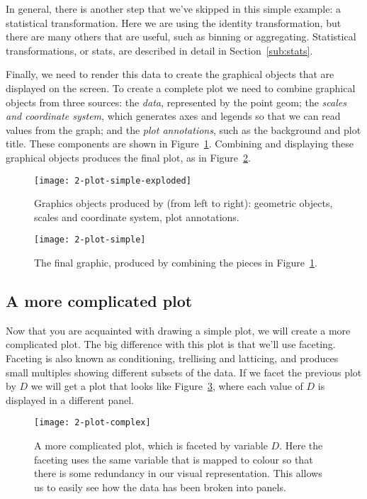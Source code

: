 In general, there is another step that we've skipped in this simple example: a statistical transformation.  Here we are using the identity transformation, but there are many others that are useful, such as binning or aggregating.  Statistical transformations, or stats, are described in detail in Section~\ref{sub:stats}.

Finally, we need to render this data to create the graphical objects that are displayed on the screen.  To create a complete plot we need to combine graphical objects from three sources: the \emph{data}, represented by the point geom; the \emph{scales and coordinate system}, which generates axes and legends so that we can read values from the graph; and the \emph{plot annotations}, such as the background and plot title.  These components are shown in Figure~\ref{fig:simple-exploded}.  Combining and displaying these graphical objects produces the final plot, as in Figure~\ref{fig:simple}.

\begin{figure}[htbp]
	\centering
		\texttt{[image: 2-plot-simple-exploded]}
	\caption{Graphics objects produced by (from left to right): geometric objects, scales and coordinate system, plot annotations.}
	\label{fig:simple-exploded}
\end{figure}

\begin{figure}[htbp]
	\centering
		\texttt{[image: 2-plot-simple]}
	\caption{The final graphic, produced by combining the pieces in Figure~\ref{fig:simple-exploded}.}
	\label{fig:simple}
\end{figure}

\subsection{A more complicated plot}\label{sec:how_to_build_a_more_complicated_plot} 

Now that you are acquainted with drawing a simple plot, we will create a more complicated plot.  The big difference with this plot is that we'll use faceting.  Faceting is also known as conditioning, trellising and latticing, and produces small multiples showing different subsets of the data.  If we facet the previous plot by $D$ we will get a plot that looks like Figure~\ref{fig:complex}, where each value of $D$ is displayed in a different panel.

\begin{figure}[htbp]
	\centering
		\texttt{[image: 2-plot-complex]}
	\caption{A more complicated plot, which is faceted by variable $D$.  Here the faceting uses the same variable that is mapped to colour so that there is some redundancy in our visual representation.  This allows us to easily see how the data has been broken into panels.}
	\label{fig:complex}
\end{figure}

